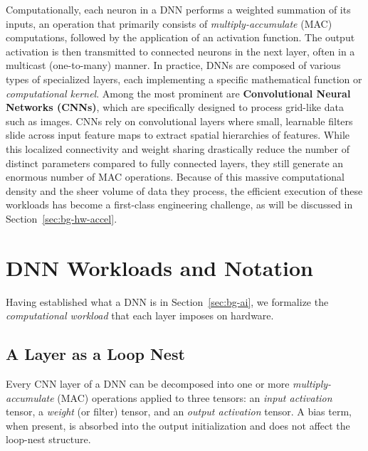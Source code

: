 Computationally, each neuron in a DNN performs a weighted summation of its
inputs, an operation that primarily consists of \emph{multiply-accumulate}
(MAC) computations, followed by the application of an activation function.
The output activation is then transmitted to connected neurons in the next
layer, often in a multicast (one-to-many) manner.
In practice, DNNs are composed of various types of specialized
layers, each implementing a specific mathematical function or
\emph{computational kernel}. Among the most prominent are 
\textbf{Convolutional Neural Networks (CNNs)}, 
which are specifically designed to process grid-like data such as images. 
CNNs rely on convolutional layers where small, learnable filters slide across 
input feature maps to extract spatial hierarchies of features. While this localized 
connectivity and weight sharing drastically reduce the number of distinct parameters 
compared to fully connected layers, they still generate an enormous number of MAC 
operations. Because of this massive computational density and the sheer volume of 
data they process, the efficient execution of these workloads has become a 
first-class engineering challenge, as will be discussed in Section~\ref{sec:bg-hw-accel}.
\section{DNN Workloads and Notation}
\label{sec:bg-workloads}

Having established what a DNN is in Section~\ref{sec:bg-ai}, we
formalize the \emph{computational workload} that each layer imposes on
hardware.


\subsection{A Layer as a Loop Nest}
\label{sec:loop-nest}

Every CNN layer of a DNN can be decomposed into one or more
\emph{multiply-accumulate} (MAC) operations applied to three tensors:
an \emph{input activation} tensor, a \emph{weight} (or filter) tensor,
and an \emph{output activation} tensor.
A bias term, when present, is absorbed into the output initialization and
does not affect the loop-nest structure.

